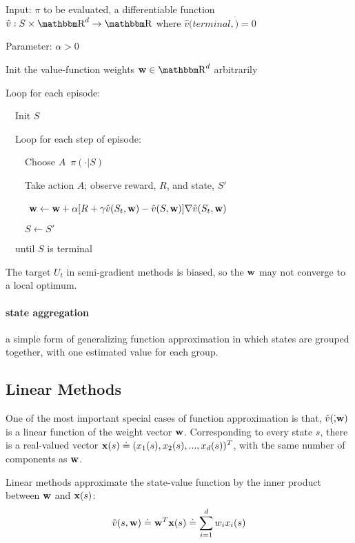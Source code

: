 \documentclass[sutton_barto_notes.tex]{subfiles}
\begin{document}
\begin{tcolorbox}[width=1.1\textwidth,title={Semi-gradient TD(0) for Estimating $\hat{v}\approx v_\pi$}]
Input: $\pi$ to be evaluated, a differentiable function $\hat{v}:S\times\R^d \rightarrow \R$ where $\hat{v}(terminal,\dot)=0$

Parameter: $\alpha > 0$

Init the value-function weights ${\bw} \in \R^d$ arbitrarily

Loop for each episode:

$\quad$Init $S$

$\quad$Loop for each step of episode:

$\quad\quad$Choose $A$~$\pi(\cdot | S)$

$\quad\quad$Take action $A$; observe reward, $R$, and state, $S'$

$\quad\quad$ ${\operatorname*{\mathbf{w}}} \leftarrow {\operatorname*{\mathbf{w}}} + \alpha [ R + \gamma \hat{v}(S_t, {\operatorname*{\mathbf{w}}}) - \hat{v}(S,{\operatorname*{\mathbf{w}}})]\nabla \hat{v}(S_t, {\operatorname*{\mathbf{w}}})$

$\quad\quad S \leftarrow S'$

$\quad$until $S$ is terminal
\end{tcolorbox}

The target $U_t$ in semi-gradient methods is biased, so the ${\operatorname*{\mathbf{w}}}$ may not converge to a local optimum.



\paragraph{state aggregation} a simple form of generalizing function approximation in which states are grouped together, with one estimated value for each group.



\subsection{Linear Methods}

One of the most important special cases of function approximation is that, $\hat{v}(\dot, {\operatorname*{\mathbf{w}}})$ is a linear function of the weight vector ${\operatorname*{\mathbf{w}}}$. Corresponding to every state $s$, there is a real-valued vector ${\operatorname*{\mathbf{x}}}(s)\doteq (x_1(s),x_2(s),...,x_d(s))^T$, with the same number of components as ${\operatorname*{\mathbf{w}}}$.

Linear methods approximate the state-value function by the inner product between ${\operatorname*{\mathbf{w}}}$ and ${\operatorname*{\mathbf{x}}}(s)$:
$$\hat{v}(s,{\operatorname*{\mathbf{w}}}) \doteq {\operatorname*{\mathbf{w}}}^T{\operatorname*{\mathbf{x}}}(s)\doteq \sum_{i=1}^d w_i x_i(s) $$
\end{document}
